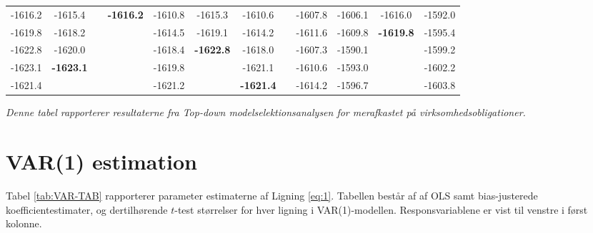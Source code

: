 \documentclass[
  a4paper,
  oneside]{memoir}
\begin{document}
\begin{landscape}
\begin{table}[H]
\begin{threeparttable}
\begin{tabular}[t]{cccccccccccc}
\rowcolor{gray!6}  -1616.2 & -1615.4 &  & \textbf{-1616.2} & -1610.8 & -1615.3 & -1610.6 &  & -1607.8 & -1606.1 & -1616.0 & -1592.0\\
 
-1619.8 & -1618.2 &  &  & -1614.5 & -1619.1 & -1614.2 &  & -1611.6 & -1609.8 & \textbf{-1619.8} & -1595.4\\
 
\rowcolor{gray!6}  -1622.8 & -1620.0 &  &  & -1618.4 & \textbf{-1622.8} & -1618.0 &  & -1607.3 & -1590.1 &  & -1599.2\\
 
-1623.1 & \textbf{-1623.1} &  &  & -1619.8 &  & -1621.1 &  & -1610.6 & -1593.0 &  & -1602.2\\
 
\rowcolor{gray!6}  -1621.4 &  &  &  & -1621.2 &  & \textbf{-1621.4} &  & -1614.2 & -1596.7 &  & -1603.8\\
\bottomrule
\end{tabular}
\begin{tablenotes}
\item \textit{Denne tabel rapporterer resultaterne fra \textit{Top-down} modelselektionsanalysen for merafkastet på virksomhedsobligationer.}
\end{tablenotes}
\end{threeparttable}
\end{table}
\end{landscape}

\hypertarget{var1est}{%
\section{VAR(1) estimation}\label{var1est}}

Tabel \ref{tab:VAR-TAB} rapporterer parameter estimaterne af Ligning \eqref{eq:1}. Tabellen består af af OLS samt bias-justerede koefficientestimater, og dertilhørende \(t\)-test størrelser for hver ligning i VAR(1)-modellen. Responsvariablene er vist til venstre i først kolonne.
\end{document}
